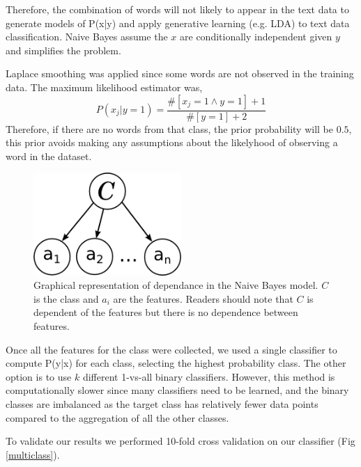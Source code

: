 \documentclass[10pt,twocolumn]{article}
\begin{document}
Therefore, the combination of words will not likely to appear in the text data to generate models of P(x|y) and apply generative learning (e.g. LDA) to text data classification.
Naive Bayes assume the $x$ are conditionally independent given $y$ and simplifies the problem.\autocite{jordan2002discriminative}


Laplace smoothing was applied since some words are not observed in the training data. The maximum likelihood estimator was,
\[
P(x_j|y=1) = \frac {\#[x_j=1 \land y=1]+1}{\#[y=1]+2}
\]
Therefore, if there are no words from that class, the prior probability will be $0.5$, this prior avoids making any assumptions about the likelyhood of observing a word in the dataset.

\begin{figure}
    \centering  
    \includegraphics[width=0.5\textwidth]{./sysmag_bayes.png}
    \caption{Graphical representation of dependance in the Naive Bayes model. $C$ is the class and $a_i$ are the features. Readers should note that $C$ is dependent of the features but there is no dependence between features. }
    \label{bayesnet}
\end{figure}

Once all the features for the class were collected, we used a single classifier to compute P(y|x) for each class, selecting the highest probability class. The other option is to use $k$ different 1-vs-all binary classifiers. However, this method is computationally slower since many classifiers need to be learned, and the binary classes are imbalanced as the target class has relatively fewer data points compared to the aggregation of all the other classes.

To validate our results we performed 10-fold cross validation on our classifier (Fig \ref{multiclass}).
\end{document}
